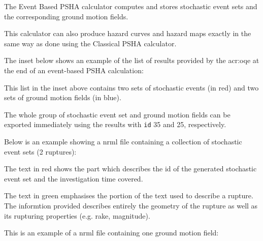 The Event Based PSHA calculator computes and stores stochastic event sets and
the corresponding ground motion fields.

This calculator can also produce hazard curves and hazard maps exactly in the
same way as done using the Classical PSHA calculator.

The inset below shows an example of the list of results provided by the
\gls{acr:oqe} at the end of an event-based PSHA calculation:



This list in the inset above contains two sets of stochastic events (in red)
and two sets of ground motion fields (in blue).

The whole group of stochastic event set and ground motion fields can be
exported immediately using the results with \texttt{id} 35 and 25, respectively.

Below is an example showing a nrml file containing a collection of stochastic
event sets (2 ruptures):



The text in red shows the part which describes the id of the generated
stochastic event set and the investigation time covered.

The text in green emphasises the portion of the text used to describe a
rupture. The informtion provided describes entirely the geometry of the rupture
as well as its rupturing properties (e.g. rake, magnitude).

This is an example of a nrml file containing one ground motion field:


